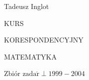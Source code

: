 \documentclass[a4paper,12pt]{article}
\begin{document}
Tadeusz Inglot

KURS

KORESPONDENCYJNY

MATEMATYKA

Zbiór $\mathrm{z}\mathrm{a}\mathrm{d}\mathrm{a}\acute{\mathrm{r}}\perp 1999-2004$
\end{document}
